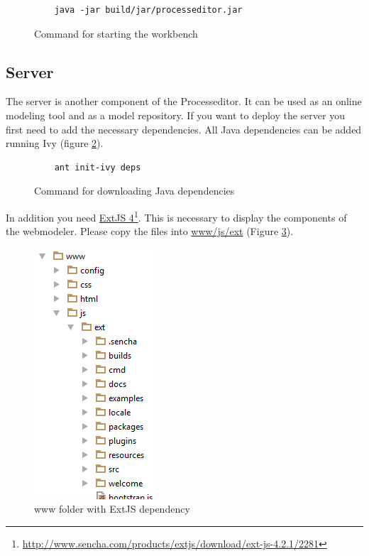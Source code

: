 \begin{figure}[h!]
\begin{verbatim}
	java -jar build/jar/processeditor.jar
\end{verbatim}
\caption{Command for starting the workbench}
\label{lis:startworkbench}
\end{figure}

\subsection{Server}

The server is another component of the Processeditor. It can be used as an online modeling tool and as a model repository.
If you want to deploy the server you first need to add the necessary dependencies.
All Java dependencies can be added running Ivy (figure \ref{lis:ivy}).

\begin{figure}[h!]
\begin{verbatim}
	ant init-ivy deps
\end{verbatim}
\caption{Command for downloading Java dependencies}
\label{lis:ivy}
\end{figure}

In addition you need \href{http://www.sencha.com/products/extjs/download/ext-js-4.2.1/2281}{ExtJS 4}\footnote{\url{http://www.sencha.com/products/extjs/download/ext-js-4.2.1/2281}}. This is necessary to display the components of the webmodeler. Please copy the files into \url{www/js/ext} (Figure \ref{pic:ext}).

\begin{figure}[h!]
\includegraphics{graphics/wwwWithExt.png}
\caption{www folder with ExtJS dependency}
\label{pic:ext}
\end{figure}

